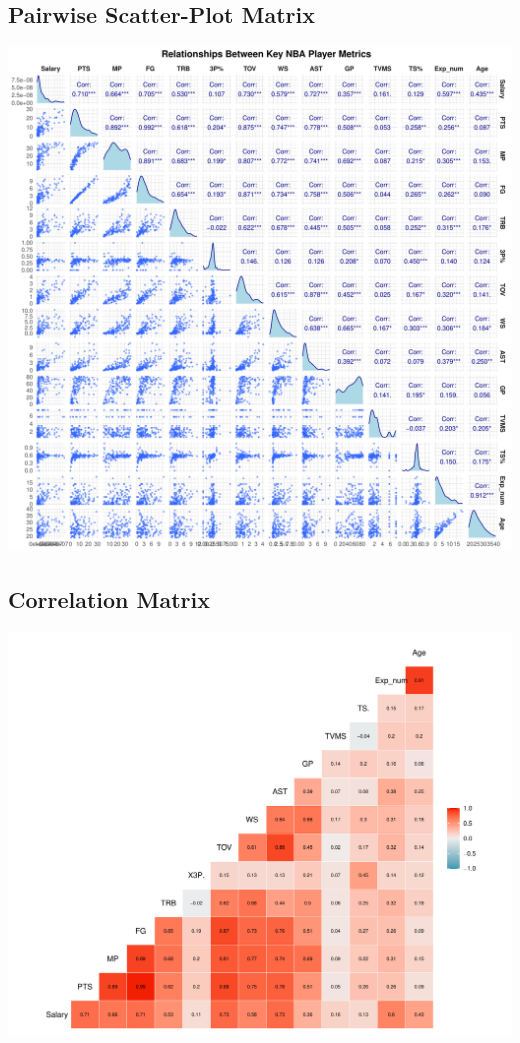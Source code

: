 \documentclass[
  11pt,
]{article}
\begin{document}
\hypertarget{fig:appendix-pairwise}{%
\subsection{Pairwise Scatter-Plot Matrix}\label{fig:appendix-pairwise}}

\includegraphics{lab2_report_short_files/figure-latex/appendix-pairwise-scatter-1.pdf}
\FloatBarrier

\hypertarget{fig:appendix-corr}{%
\subsection{Correlation Matrix}\label{fig:appendix-corr}}

\includegraphics{lab2_report_short_files/figure-latex/corr-plot-1.pdf}
\FloatBarrier
\end{document}
